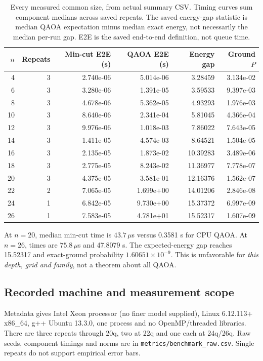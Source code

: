 \documentclass[11pt,letterpaper]{article}
\newcommand{\page}{\clearpage}
\newcommand{\file}[1]{\nolinkurl{#1}}
\begin{document}
\begin{table}[H]\centering\small
\begin{tabular}{@{}rrrrrr@{}}\toprule
$n$ & Repeats & Min-cut E2E (s) & QAOA E2E (s) & Energy gap & Ground $P$\\\midrule
4 & 3 & 2.740e-06 & 5.014e-06 & 3.28459 & 3.134e-02 \\
6 & 3 & 3.280e-06 & 1.391e-05 & 3.59533 & 9.397e-03 \\
8 & 3 & 4.678e-06 & 5.362e-05 & 4.93293 & 1.976e-03 \\
10 & 3 & 8.640e-06 & 2.341e-04 & 5.81045 & 4.366e-04 \\
12 & 3 & 9.976e-06 & 1.018e-03 & 7.86022 & 7.643e-05 \\
14 & 3 & 1.411e-05 & 4.574e-03 & 8.64521 & 1.504e-05 \\
16 & 3 & 2.135e-05 & 1.873e-02 & 10.39283 & 3.489e-06 \\
18 & 3 & 2.775e-05 & 8.243e-02 & 11.36977 & 7.778e-07 \\
20 & 3 & 4.375e-05 & 3.581e-01 & 12.16376 & 1.562e-07 \\
22 & 2 & 7.065e-05 & 1.699e+00 & 14.01206 & 2.846e-08 \\
24 & 1 & 6.842e-05 & 9.730e+00 & 15.37372 & 6.997e-09 \\
26 & 1 & 7.583e-05 & 4.781e+01 & 15.52317 & 1.607e-09 \\
\bottomrule\end{tabular}
\caption{Every measured common size, from actual summary CSV. Timing curves sum component medians across saved repeats. The saved energy-gap statistic is median QAOA expectation minus median exact energy, not necessarily the median per-run gap. E2E is the saved end-to-end definition, not queue time.}
\end{table}

At $n=20$, median min-cut time is $43.7\,\mu$s versus 0.3581 s for CPU QAOA. At $n=26$, times are $75.8\,\mu$s and 47.8079 s. The expected-energy gap reaches 15.52317 and exact-ground probability $1.60651\times10^{-9}$. This is unfavorable for \emph{this depth, grid and family}, not a theorem about all QAOA.

\subsection{Recorded machine and measurement scope}
Metadata gives Intel Xeon processor (no finer model supplied), Linux 6.12.113+ x86\_64, g++ Ubuntu 13.3.0, one process and no OpenMP/threaded libraries. There are three repeats through 20q, two at 22q and one each at 24q/26q. Raw seeds, component timings and norms are in \file{metrics/benchmark_raw.csv}. Single repeats do not support empirical error bars.
\page
\end{document}
